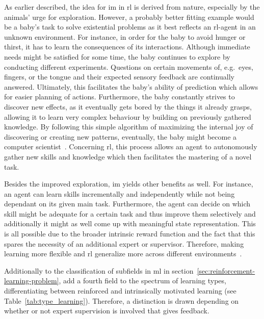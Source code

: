 \documentclass[draft,final]{vutinfth} %
\begin{document}
    As earlier described, the idea for \gls{im} in \gls{rl} is derived from nature, especially by the animals' urge for exploration.
    However, a probably better fitting example would be a baby's task to solve existential problems as it best reflects an \gls{rl}-agent in an unknown environment.
    For instance, in order for the baby to avoid hunger or thirst, it has to learn the consequences of its interactions.
    Although immediate needs might be satisfied for some time, the baby continues to explore by conducting different experiments.
    Questions on certain movements of, e.g.\ eyes, fingers, or the tongue and their expected sensory feedback are continually answered.
    Ultimately, this facilitates the baby's ability of prediction which allows for easier planning of actions.
    Furthermore, the baby constantly strives to discover new effects, as it eventually gets bored by the things it already grasps, allowing it to learn very complex behaviour by building on previously gathered knowledge.
    By following this simple algorithm of maximizing the internal joy of discovering or creating new patterns, eventually, the baby might become a computer scientist~\citep{schmidhuber_formal_2010}.
    Concerning \gls{rl}, this process allows an agent to autonomously gather new skills and knowledge which then facilitates the mastering of a novel task.

    Besides the improved exploration, \gls{im} yields other benefits as well.
    For instance, an agent can learn skills incrementally and independently while not being dependant on its given main task.
    Furthermore, the agent can decide on which skill might be adequate for a certain task and thus improve them selectively and additionally it might as well come up with meaningful state representation.
    This is all possible due to the broader intrinsic reward function and the fact that this spares the necessity of an additional expert or supervisor.
    Therefore, making learning more flexible and \gls{rl} generalize more across different environments~\citep{aubret_survey_2019}.

    Additionally to the classification of subfields in \gls{ml} in section~\ref{sec:reinforcement-learning-problem}, \citeauthor{aubret_survey_2019} add a fourth field to the spectrum of learning types, differentiating between reinforced and intrinsically motivated learning (see Table~\ref{tab:type_learning}).
    Therefore, a distinction is drawn depending on whether or not expert supervision is involved that gives feedback.
\end{document}
